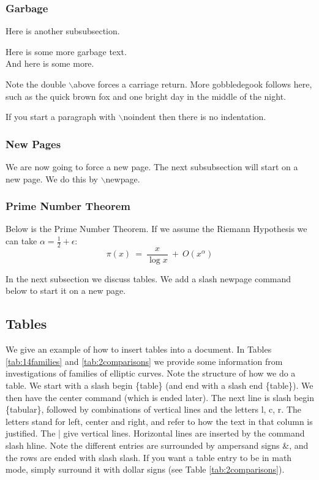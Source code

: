 \documentclass[12pt,reqno]{amsart}
\numberwithin{equation}{section}
\begin{document}
\subsubsection{Garbage}

Here is another subsubsection.

Here is some more garbage text. \\ And here is some more.

Note the double $\backslash$above forces a carriage return. More
gobbledegook follows here, such as the quick brown fox and one
bright day in the middle of the night.

\noindent If you start a paragraph with $\backslash$noindent then
there is no indentation.



\subsubsection{New Pages}

We are now going to force a new page. The next subsubsection will
start on a new page. We do this by $\backslash$newpage.

\newpage


\subsubsection{Prime Number Theorem}

Below is the Prime Number Theorem. If we assume the Riemann
Hypothesis we can take $\alpha = \frac{1}{2} + \epsilon$:
\begin{equation}
\pi(x)\ = \ \frac{x}{\log x} \ + \ O(x^\alpha)
\end{equation}

In the next subsection we discuss tables. We add a slash newpage
command below to start it on a new page.

\newpage

\subsection{Tables}

We give an example of how to insert tables into a document. In
Tables \ref{tab:14families} and \ref{tab:2comparisons} we provide
some information from investigations of families of elliptic curves.
Note the structure of how we do a table. We start with a slash begin
\{table\} (and end with a slash end \{table\}). We then have the
center command (which is ended later). The next line is slash begin
\{tabular\}, followed by combinations of vertical lines and the
letters l, c, r. The letters stand for left, center and right, and
refer to how the text in that column is justified. The | give
vertical lines. Horizontal lines are inserted by the command slash
hline. Note the different entries are surrounded by ampersand signs
\&, and the rows are ended with slash slash. If you want a table
entry to be in math mode, simply surround it with dollar signs (see
Table \ref{tab:2comparisons}).
\end{document}
